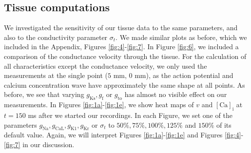 \documentclass{article}
\begin{document}
\subsection{Tissue computations} \label{Tissue computations}
We investigated the sensitivity of our tissue data to the same parameters, and also to the conductivity parameter $\sigma_t$. We made similar plots as before, which we included in the Appendix, Figures \ref{fig:4}-\ref{fig:7}. In Figure \ref{fig:6}, we included a comparison of the conductance velocity through the tissue. For the calculation of all characteristics except the conductance velocity, we only used the measurements at the single point ($5$ mm, $0$ mm), as the action potential and calcium concentration wave have approximately the same shape at all points. As before, we see that varying $g_{\mathrm{Ks}}, g_{\mathrm{f}}$ or $g_{\mathrm{to}}$ has almost no visible effect on our measurements.  In Figures  \ref{fig:1a}-\ref{fig:1e}, we show heat maps of $v$ and $[\mathrm{Ca}]_{\mathrm{i}}$ at $t=150$ ms after we started our recordings. In each Figure, we set one of the parameters $g_{\mathrm{Na}}, g_{\mathrm{CaL}}, g_{\mathrm{K1}}, g_{\mathrm{Kr}}$ or $\sigma_t$ to $50\%, 75\%, 100\%, 125\%$ and $150\%$ of its default value. Again, we will interpret Figures \ref{fig:1a}-\ref{fig:1e} and Figures \ref{fig:4}-\ref{fig:7} in our discussion.
%
\end{document}
